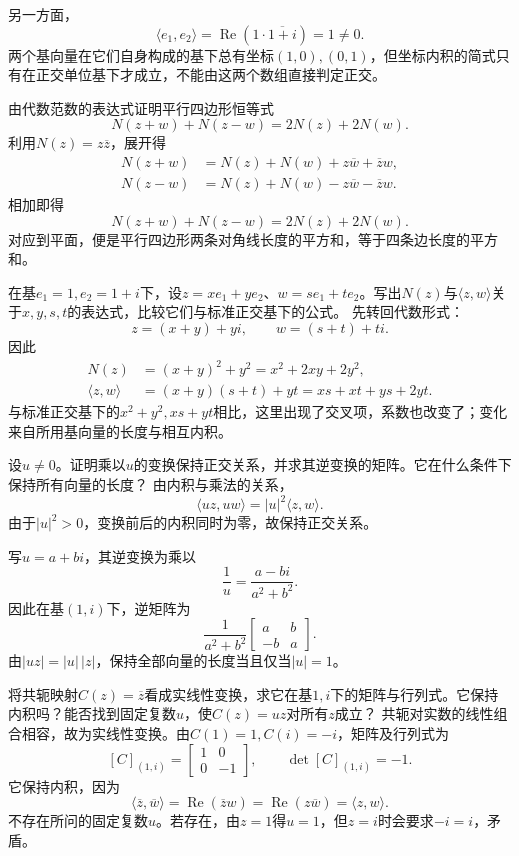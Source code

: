 另一方面，
\[
\langle e_1,e_2\rangle
=\operatorname{Re}(1\cdot\overline{1+i})=1\ne0.
\]
两个基向量在它们自身构成的基下总有坐标\((1,0),(0,1)\)，但坐标内积的简式只有在正交单位基下才成立，不能由这两个数组直接判定正交。


由代数范数的表达式证明平行四边形恒等式
\begin{equation*}
 N(z+w)+N(z-w)=2N(z)+2N(w).
\end{equation*}
\solutionanswer
利用\(N(z)=z\overline z\)，展开得
\[
\begin{aligned}
N(z+w)&=N(z)+N(w)+z\overline w+\overline z w,\\
N(z-w)&=N(z)+N(w)-z\overline w-\overline z w.
\end{aligned}
\]
相加即得
\[
N(z+w)+N(z-w)=2N(z)+2N(w).
\]
对应到平面，便是平行四边形两条对角线长度的平方和，等于四条边长度的平方和。


在基\(e_1=1,e_2=1+i\)下，设\(z=xe_1+ye_2\)、\(w=se_1+te_2\)。写出\(N(z)\)与\(\langle z,w\rangle\)关于\(x,y,s,t\)的表达式，比较它们与标准正交基下的公式。
\solutionanswer
先转回代数形式：
\[
z=(x+y)+yi,\qquad w=(s+t)+ti.
\]
因此
\[
\begin{aligned}
N(z)&=(x+y)^2+y^2=x^2+2xy+2y^2,\\
\langle z,w\rangle&=(x+y)(s+t)+yt
=xs+xt+ys+2yt.
\end{aligned}
\]
与标准正交基下的\(x^2+y^2,xs+yt\)相比，这里出现了交叉项，系数也改变了；变化来自所用基向量的长度与相互内积。


设\(u\ne0\)。证明乘以\(u\)的变换保持正交关系，并求其逆变换的矩阵。它在什么条件下保持所有向量的长度？
\solutionanswer
由内积与乘法的关系，
\[
\langle uz,uw\rangle=|u|^2\langle z,w\rangle.
\]
由于\(|u|^2>0\)，变换前后的内积同时为零，故保持正交关系。

写\(u=a+bi\)，其逆变换为乘以
\[
\frac1u=\frac{a-bi}{a^2+b^2}.
\]
因此在基\((1,i)\)下，逆矩阵为
\[
\frac1{a^2+b^2}\begin{bmatrix}a&b\\-b&a\end{bmatrix}.
\]
由\(|uz|=|u|\,|z|\)，保持全部向量的长度当且仅当\(|u|=1\)。


将共轭映射\(C(z)=\overline z\)看成实线性变换，求它在基\(1,i\)下的矩阵与行列式。它保持内积吗？能否找到固定复数\(u\)，使\(C(z)=uz\)对所有\(z\)成立？
\solutionanswer
共轭对实数的线性组合相容，故为实线性变换。由\(C(1)=1,C(i)=-i\)，矩阵及行列式为
\[
[C]_{(1,i)}=\begin{bmatrix}1&0\\0&-1\end{bmatrix},
\qquad\det[C]_{(1,i)}=-1.
\]
它保持内积，因为
\[
\langle\overline z,\overline w\rangle
=\operatorname{Re}(\overline z w)
=\operatorname{Re}(z\overline w)=\langle z,w\rangle.
\]
不存在所问的固定复数\(u\)。若存在，由\(z=1\)得\(u=1\)，但\(z=i\)时会要求\(-i=i\)，矛盾。


